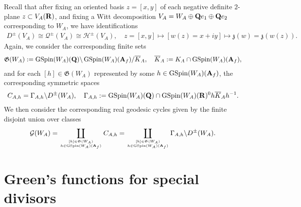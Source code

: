 \documentclass{amsart}
\theoremstyle{definition}
\theoremstyle{definition}
\theoremstyle{definition}
\begin{document}
Recall that after fixing an oriented basis $z = [x,y]$ of each negative definite $2$-plane $z \subset V_A({\bf{R}})$, and fixing a Witt 
decomposition $V_A = W_A \oplus {\bf{Q}} e_1 \oplus {\bf{Q}} e_2$ corresponding to $W_A$, we have identifications
\begin{align*} D^{\pm}(V_A) \cong \mathcal{Q}^{\pm}(V_A) \cong \mathcal{H}^{\pm}(V_A),
\quad z = [x, y] \mapsto [w(z) = x + iy] \mapsto \mathfrak{z}(w) = \mathfrak{z}(w(z)). \end{align*}
Again, we consider the corresponding finite sets 
\begin{align*} \mathfrak{G}(W_A) &:= \operatorname{GSpin}(W_A)({\bf{Q}}) \backslash \operatorname{GSpin}(W_A)({\bf{A}}_f) / \overline{K}_A,
\quad \overline{K}_A := K_A \cap \operatorname{GSpin}(W_A)({\bf{A}}_f),\end{align*}
and for each $[h] \in \mathfrak{G}(W_A)$ represented by some $h \in \operatorname{GSpin}(W_A)({\bf{A}}_f)$, the corresponding symmetric spaces 
\begin{align*} C_{A, h} &= \Gamma_{A,h} \backslash D^{\pm}(W_A), 
\quad \Gamma_{A,h} := \operatorname{GSpin}(W_A)({\bf{Q}}) \cap \operatorname{GSpin}(W_A)({\bf{R}})^0 h \overline{K}_A h^{-1}. \end{align*}
We then consider the corresponding real geodesic cycles given by the finite disjoint union over classes
\begin{equation*}\begin{aligned}
\mathcal{G}(W_A)  &= \coprod\limits_{[h] \in \mathfrak{G}(W_A) \atop h \in \operatorname{GSpin}(W_A)({\bf{A}}_f)} C_{A,h}
=  \coprod\limits_{[h] \in \mathfrak{G}(W_A) \atop h \in \operatorname{GSpin}(W_A)({\bf{A}}_f)} \Gamma_{A,h} \backslash D^{\pm}(W_A). \end{aligned}\end{equation*}

\section{Green's functions for special divisors}
\end{document}
